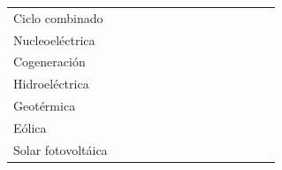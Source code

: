 \documentclass{sener2025}
\begin{document}
\begin{tabladoradoLargo}
\begin{xltabular}{\textwidth}{QZZZZZZZZZZZZZ}
    \hspace{2.7em} Ciclo combinado &  &  &  &  &  &  &  &  &  &  &  &  &  \\
    \hspace{2.7em} Nucleoeléctrica &  &  &  &  &  &  &  &  &  &  &  &  &  \\
    \hspace{2.7em} Cogeneración &  &  &  &  &  &  &  &  &  &  &  &  &  \\
    \hspace{2.7em} Hidroeléctrica &  &  &  &  &  &  &  &  &  &  &  &  &  \\
    \hspace{2.7em} Geotérmica &  &  &  &  &  &  &  &  &  &  &  &  &  \\
    \hspace{2.7em} Eólica &  &  &  &  &  &  &  &  &  &  &  &  &  \\
    \hspace{2.7em} Solar fotovoltáica &  &  &  &  &  &  &  &  &  &  &  &  &  \\
  \end{xltabular}
\end{tabladoradoLargo}
\vspace{-4pt}
\end{document}
